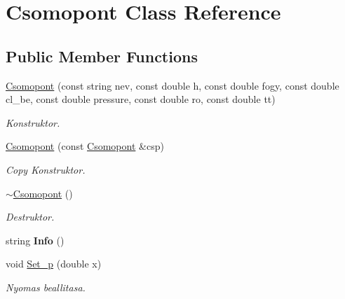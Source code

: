 \hypertarget{class_csomopont}{}\section{Csomopont Class Reference}
\label{class_csomopont}
\subsection*{Public Member Functions}
\begin{DoxyCompactItemize}
\item 
\hypertarget{class_csomopont_af04abc9d2970dd817ff15cb675925635}{}\label{class_csomopont_af04abc9d2970dd817ff15cb675925635} 
\hyperlink{class_csomopont_af04abc9d2970dd817ff15cb675925635}{Csomopont} (const string nev, const double h, const double fogy, const double cl\+\_\+be, const double pressure, const double ro, const double tt)
\begin{DoxyCompactList}\small\item\em Konstruktor. \end{DoxyCompactList}\item 
\hypertarget{class_csomopont_ab75df66e91e91f104d743c821ca58acf}{}\label{class_csomopont_ab75df66e91e91f104d743c821ca58acf} 
\hyperlink{class_csomopont_ab75df66e91e91f104d743c821ca58acf}{Csomopont} (const \hyperlink{class_csomopont}{Csomopont} \&csp)
\begin{DoxyCompactList}\small\item\em Copy Konstruktor. \end{DoxyCompactList}\item 
\hypertarget{class_csomopont_a54cde5164ba96dc2898d345ebae8dc95}{}\label{class_csomopont_a54cde5164ba96dc2898d345ebae8dc95} 
\hyperlink{class_csomopont_a54cde5164ba96dc2898d345ebae8dc95}{$\sim$\+Csomopont} ()
\begin{DoxyCompactList}\small\item\em Destruktor. \end{DoxyCompactList}\item 
\hypertarget{class_csomopont_a2f90b4f53a8f37b542b8e65be9d2bed9}{}\label{class_csomopont_a2f90b4f53a8f37b542b8e65be9d2bed9} 
string {\bfseries Info} ()
\item 
\hypertarget{class_csomopont_a77f11475136286565a249513a7312206}{}\label{class_csomopont_a77f11475136286565a249513a7312206} 
void \hyperlink{class_csomopont_a77f11475136286565a249513a7312206}{Set\+\_\+p} (double x)
\begin{DoxyCompactList}\small\item\em Nyomas beallitasa. \end{DoxyCompactList}\item 

\end{DoxyCompactItemize}
